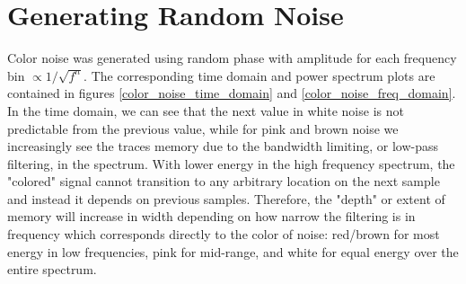 \documentclass[10pt]{article}
\begin{document}
\section{Generating Random Noise}
Color noise was generated using random phase with amplitude for each frequency bin $\propto 1/\sqrt{f^n}$. The corresponding time domain and power spectrum plots are contained in figures \ref{color_noise_time_domain} and \ref{color_noise_freq_domain}. In the time domain, we can see that the next value in white noise is not predictable from the previous value, while for pink and brown noise we increasingly see the traces memory due to the bandwidth limiting, or low-pass filtering, in the spectrum. With lower energy in the high frequency spectrum, the "colored" signal cannot transition to any arbitrary location on the next sample and instead it depends on previous samples. Therefore, the "depth" or extent of memory will increase in width depending on how narrow the filtering is in frequency which corresponds directly to the color of noise: red/brown for most energy in low frequencies, pink for mid-range, and white for equal energy over the entire spectrum.
\end{document}
